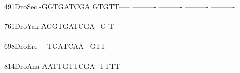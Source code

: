 \documentclass[11pt,twoside,reqno,a4paper]{article}
\begin{document}
{491\hspace*{2\charwidth}DroSec	-GGTGATCGA	GTGTT-----	----------	----------	----------	----------	\\
\hspace*{5\charwidth}\hspace*{7\charwidth}\hspace*{1\charwidth}\hspace*{1\charwidth}\hspace*{1\charwidth}\hspace*{1\charwidth}\hspace*{1\charwidth}\hspace*{1\charwidth}\\
761\hspace*{2\charwidth}DroYak	AGGTGATCGA	--G-T-----	----------	----------	----------	----------	\\
\hspace*{5\charwidth}\hspace*{7\charwidth}\hspace*{1\charwidth}\hspace*{1\charwidth}\hspace*{1\charwidth}\hspace*{1\charwidth}\hspace*{1\charwidth}\hspace*{1\charwidth}\\
698\hspace*{2\charwidth}DroEre	---TGATCAA	--GTT-----	----------	----------	----------	----------	\\
\hspace*{5\charwidth}\hspace*{7\charwidth}\hspace*{1\charwidth}\hspace*{1\charwidth}\hspace*{1\charwidth}\hspace*{1\charwidth}\hspace*{1\charwidth}\hspace*{1\charwidth}\\
814\hspace*{2\charwidth}DroAna	AATTGTTCGA	-TTTT-----	----------	----------	----------	----------	\\
\hspace*{5\charwidth}\hspace*{7\charwidth}\hspace*{1\charwidth}\hspace*{1\charwidth}\hspace*{1\charwidth}\hspace*{1\charwidth}\hspace*{1\charwidth}\hspace*{1\charwidth}\\
}
\end{document}
